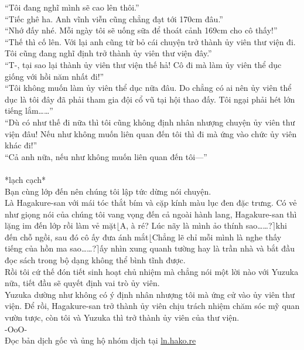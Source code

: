 \documentclass[12pt,a4paper, twosides]{book}
\begin{document}
“Tôi đang nghĩ mình sẽ cao lên thôi.”\\
“Tiếc ghê ha. Anh vĩnh viễn cũng chẳng đạt tới 170cm đâu.”\\
“Nhớ đấy nhé. Mỗi ngày tôi sẽ uống sữa để thoát cảnh 169cm cho cô thấy!”\\
“Thế thì cố lên. Với lại anh cũng từ bỏ cái chuyện trở thành ủy viên thư viện đi. Tôi cũng đang nghĩ định trở thành ủy viên thư viện đây.”\\
“T-, tại sao lại thành ủy viên thư viện thế hả! Cô đi mà làm ủy viên thể dục giống với hồi năm nhất đi!”\\
“Tôi không muốn làm ủy viên thể dục nữa đâu. Do chẳng có ai nên ủy viên thể dục là tôi đây đã phải tham gia đội cổ vũ tại hội thao đấy. Tôi ngại phải hét lớn tiếng lắm……”\\
“Dù có như thế đi nữa thì tôi cũng không định nhân nhượng chuyện ủy viên thư viện đâu! Nếu như không muốn liên quan đến tôi thì đi mà ứng vào chức ủy viên khác đi!”\\
“Cả anh nữa, nếu như không muốn liên quan đến tôi—”\\
\\
*lạch cạch*\\
Bạn cùng lớp đến nên chúng tôi lập tức dừng nói chuyện.\\
Là Hagakure-san với mái tóc thắt bím và cặp kính màu lục đen đặc trưng. Có vẻ như giọng nói của chúng tôi vang vọng đến cả ngoài hành lang, Hagakure-san thì lặng im đến lớp rồi làm vẻ mặt$\lfloor$A, à ré? Lúc nãy là mình ảo thính sao……?$\rceil$khi đến chỗ ngồi, sau đó cô ấy đưa ánh mắt$\lfloor$Chẳng lẽ chỉ mỗi mình là nghe thấy tiếng của hồn ma sao……?$\rceil$ấy nhìn xung quanh tường hay là trần nhà và bắt đầu đọc sách trong bộ dạng không thể bình tĩnh được.\\
Rồi tôi cứ thế đón tiết sinh hoạt chủ nhiệm mà chẳng nói một lời nào với Yuzuka nữa, tiết đầu sẽ quyết định vai trò ủy viên.\\
Yuzuka dường như không có ý định nhân nhượng tôi mà ứng cử vào ủy viên thư viện. Để rồi, Hagakure-san trở thành ủy viên chịu trách nhiệm chăm sóc mỹ quan vườn tược, còn tôi và Yuzuka thì trở thành ủy viên của thư viện.\\
-OoO-\\
Đọc bản dịch gốc và ủng hộ nhóm dịch tại \href{https://ln.hako.re/}{ln.hako.re}\\
\newpage
\end{document}

